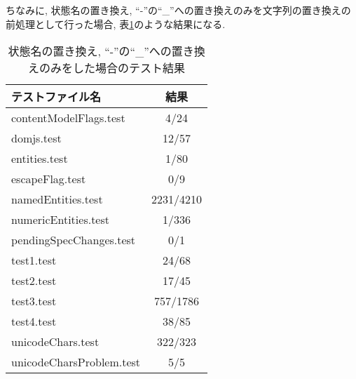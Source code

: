 \documentclass[uplatex,a4j]{jsreport}
\begin{document}
ちなみに, 状態名の置き換え, ``-''の``_''への置き換えのみを文字列の置き換えの前処理として行った場合, 表\ref{置き換えなし}のような結果になる. 
\begin{table}[H]
  \begin{center}
  \label{置き換えなし}
  \caption{状態名の置き換え, ``-''の``_''への置き換えのみをした場合のテスト結果}
  \begin{tabular}{|l|c|} \hline
    テストファイル名 & 結果 \\ \hline 
    contentModelFlags.test & 4/24  \\
    domjs.test & 12/57  \\
    entities.test & 1/80 \\
    escapeFlag.test & 0/9 \\
    namedEntities.test & 2231/4210 \\
    numericEntities.test & 1/336 \\
    pendingSpecChanges.test & 0/1 \\
    test1.test & 24/68 \\
    test2.test & 17/45 \\
    test3.test & 757/1786 \\
    test4.test & 38/85 \\
    unicodeChars.test & 322/323 \\
    unicodeCharsProblem.test & 5/5 \\ \hline 
  \end{tabular}
\end{center}
\end{table}

\end{document}
